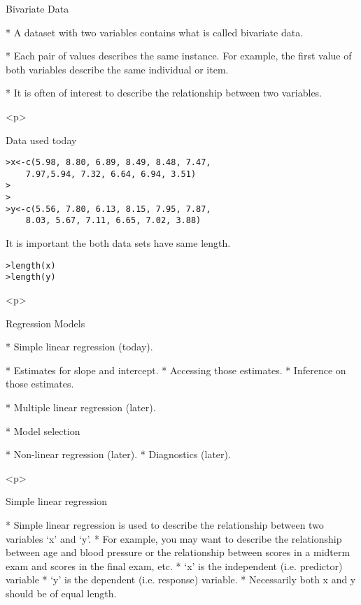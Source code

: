 


\begin{slide}{Bivariate Data}

\begin{itemize}
* A dataset with two variables contains what is called bivariate data.

* Each pair of values describes the same instance. For example, the first value of both variables describe the same individual or item.
    
* It is often of interest to describe the relationship between two variables.
\end{itemize}
<p>

\begin{slide}{Data used today}

\begin{verbatim}
>x<-c(5.98, 8.80, 6.89, 8.49, 8.48, 7.47,
    7.97,5.94, 7.32, 6.64, 6.94, 3.51)
>
>
>y<-c(5.56, 7.80, 6.13, 8.15, 7.95, 7.87,
    8.03, 5.67, 7.11, 6.65, 7.02, 3.88)

\end{verbatim}
It is important the both data sets have same length.
\begin{verbatim}
>length(x)
>length(y)

\end{verbatim}
<p>

\begin{slide}{Regression Models}

\begin{itemize}
* Simple linear regression (today).
    \begin{itemize}
    * Estimates for slope and intercept.
    * Accessing those estimates.
    * Inference on those estimates.
    \end{itemize}
* Multiple linear regression (later).
    \begin{itemize}
    * Model selection
    \end{itemize}
* Non-linear regression (later).
* Diagnostics (later).
\end{itemize}
<p>
\begin{slide}{Simple linear regression}
\begin{itemize}
* Simple linear regression is used to describe the relationship
between two variables `x' and `y'. * For example, you may want to describe the
relationship between age and blood pressure or the relationship
between scores in a midterm exam and scores in the final exam,
etc.
* `x' is the independent (i.e. predictor) variable
* `y' is the dependent (i.e. response) variable.
* Necessarily both x and y should be of equal length.


\end{itemize}
\end{slide}
\end{slide}
\end{slide}
\end{slide}

